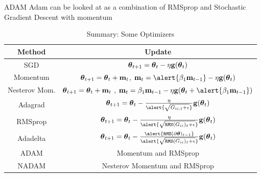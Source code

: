 \documentclass[xcolor=pdftex,dvipsnames,table,mathserif]{beamer}
\begin{document}
\begin{frame}{ADAM}
Adam can be looked at as a combination of RMSprop and Stochastic Gradient Descent with momentum \cite{kingma2014adam}
\begin{table}[htp]
\caption{Summary: Some Optimizers}
\begin{center}
\begin{tabular}{|c|c|} \hline
Method & Update\\ \hline
SGD  & $\boldsymbol{\theta}_{t+1}= \boldsymbol{\theta}_{t}-\eta\mathbf{g}(\boldsymbol{\theta}_{t})$ \\ \hline
Momentum    & $\boldsymbol{\theta}_{t+1}= \boldsymbol{\theta}_{t}+\mathbf{m}_t$, $\mathbf{m}_{t}= \alert{\beta_1 \mathbf{m}_{t-1}} -\eta \mathbf{g}(\param_{t}) $ \\  \hline
Nesterov Mom.  &  $\boldsymbol{\theta}_{t+1}= \boldsymbol{\theta}_{t}+\mathbf{m}_t$ , $\mathbf{m}_t= \beta_1 \mathbf{m}_{t-1} -\eta\mathbf{g}(\param_{t}+ \alert{\beta_1 \mathbf{m}_{t-1}}) $\\ \hline
Adagrad & $\param_{t+1}= \param_{t}- \frac{\eta}{\alert{\sqrt { G_{ii,t}+\epsilon  }}} \mathbf{g}(\param_{t})$  \\ \hline
RMSprop & $\param_{t+1}= \param_{t}- \frac{\eta}{\alert{\sqrt { \texttt{RMS}(G_{ii})_{t}+\epsilon  }}} \mathbf{g}(\param_{t})$  \\ \hline
Adadelta & $ \param_{t+1}= \param_{t}- \frac{\alert{ \texttt{RMS}(\partial\param)_{t-1}}}{\alert{\sqrt { \texttt{RMS}(G_{ii})_{t}+\epsilon  }}} \mathbf{g}(\param_{t})$ \\ \hline
ADAM&  Momentum  and RMSprop \\ \hline
NADAM&  Nesterov Momentum  and RMSprop \\ \hline
\end{tabular}
\end{center}
\label{default}
\end{table}%
\end{frame}


\end{document}
